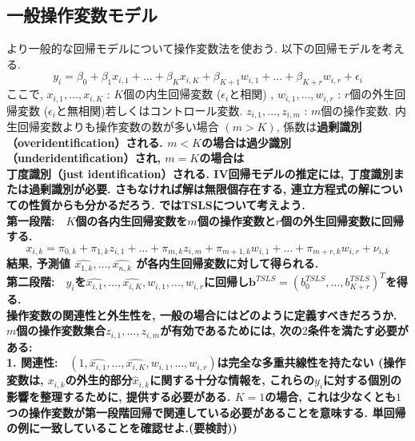 \documentclass[paper=a4paper,fontsize=10pt]{jlreq}
\begin{document}
\subsection{一般操作変数モデル}
より一般的な回帰モデルについて操作変数法を使おう. 以下の回帰モデルを考える.
\begin{equation*}
  y_i = \beta_0 + \beta_1 x_{i,1} + \dots + \beta_K x_{i,K} + \beta_{K+1} w_{i,1} + \dots + \beta_{K+r} w_{i,r} + \epsilon_i
\end{equation*}
ここで, $x_{i,1}, \dots, x_{i,K}$ : $K$個の内生回帰変数 ($\epsilon_i$と相関) , $w_{i,1}, \dots, w_{i,r}$ : $r$個の外生回帰変数 ($\epsilon_i$と無相関)若しくはコントロール変数. $z_{i,1}, \dots, z_{i,m}$ : $m$個の操作変数. 内生回帰変数よりも操作変数の数が多い場合 $(m > K)$, 係数は\rmfamily\mcfamily\bfseries{過剰識別（overidentification）}\mdseries される. $m < K$の場合は\rmfamily\mcfamily\bfseries{過少識別（underidentification）}\mdseries され, $m = K$の場合は\rmfamily\mcfamily\bfseries{丁度識別（just identification）}\mdseries される. IV回帰モデルの推定には, \rmfamily\mcfamily\bfseries{丁度識別または過剰識別}\mdseries が必要. さもなければ解は無限個存在する, 連立方程式の解についての性質からも分かるだろう. ではTSLSについて考えよう.\\

\rmfamily\mcfamily\bfseries{第一段階}\mdseries :　$K$個の各内生回帰変数を$m$個の操作変数と$r$個の外生回帰変数に回帰する.
\begin{equation*}
  x_{i,k} = \pi_{0,k} + \pi_{1,k}z_{i,1} + \dots + \pi_{m,k}z_{i,m} + \pi_{m+1,k}w_{i,1} + \dots + \pi_{m+r,k}w_{i,r} + \nu_{i,k}
\end{equation*}
結果, 予測値 $\hat{x_{1,k}}, \dots, \hat{x_{n,k}}$ が各内生回帰変数に対して得られる.\\

\rmfamily\mcfamily\bfseries{第二段階}\mdseries :　$y_i$を$\hat{x_{i,1}}, \dots, \hat{x_{i,K}}, w_{i,1}, \dots, w_{i,r}$に回帰し$\mathbf{b}^{TSLS} = (b_0^{TSLS}, \dots, b_{K+r}^{TSLS})^T$を得る.\\

操作変数の\rmfamily\mcfamily\bfseries{関連性と外生性}\mdseries を, 一般の場合にはどのように定義すべきだろうか. $m$個の操作変数集合$z_{i,1}, \dots, z_{i,m}$が有効であるためには, 次の$2$条件を満たす必要がある:\\

\rmfamily\mcfamily\bfseries{1. 関連性}\mdseries :　$(1, \hat{x_{i,1}}, \dots, \hat{x_{i,K}}, w_{i,1}, \dots, w_{i,r})$は完全な多重共線性を持たない (操作変数は, $x_{i,k}$の外生的部分$\hat{x}_{i,k}$に関する十分な情報を, これらの$y_i$に対する個別の影響を整理するために, 提供する必要がある. $K = 1$の場合, これは少なくとも$1$つの操作変数が第一段階回帰で関連している必要があることを意味する. 単回帰の例に一致していることを確認せよ.(要検討))
\end{document}
